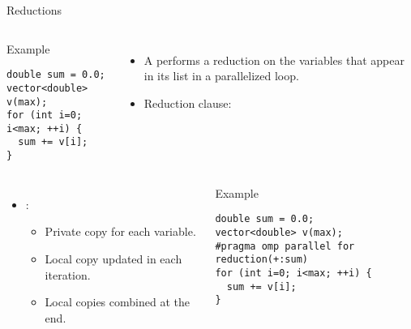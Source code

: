 \begin{frame}[t,fragile,shrink=10]{Reductions}
\begin{columns}


\begin{block}{Example}
\begin{lstlisting}
double sum = 0.0; 
vector<double> v(max);
for (int i=0; i<max; ++i) {
  sum += v[i];
}
\end{lstlisting}
\end{block}

\begin{itemize}
  \item A  performs a reduction on the variables that appear in its list in a parallelized loop.
  \pause
  \item Reduction clause: 
\end{itemize}

\end{columns}


\begin{columns}


\begin{itemize}
  \item {}:
    \begin{itemize}
      \item Private copy for each variable.
      \item Local copy updated in each iteration.
      \item Local copies combined at the end.
    \end{itemize}
\end{itemize}


\pause
\begin{block}{Example}
\begin{lstlisting}
double sum = 0.0; 
vector<double> v(max);
#pragma omp parallel for reduction(+:sum)
for (int i=0; i<max; ++i) {
  sum += v[i];
}
\end{lstlisting}
\end{block}

\end{columns}

\end{frame}

